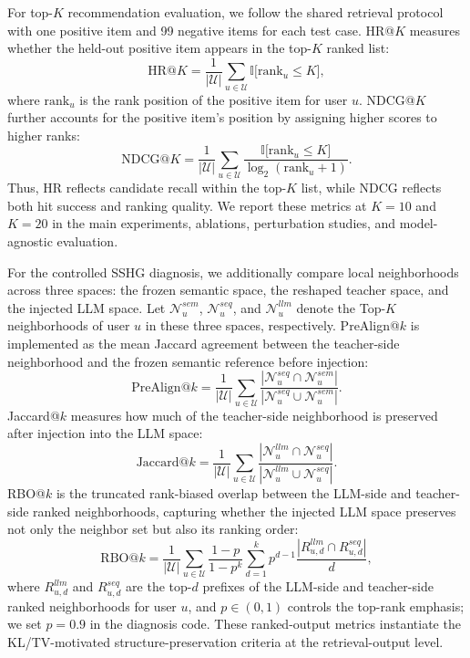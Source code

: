 ﻿\documentclass{article}
\begin{document}
For top-\(K\) recommendation evaluation, we follow the shared retrieval protocol with one positive item and 99 negative items for each test case. HR@$K$ measures whether the held-out positive item appears in the top-\(K\) ranked list:
\begin{equation}
\mathrm{HR@}K
=
\frac{1}{|\mathcal U|}\sum_{u\in\mathcal U}
\mathbb{I}\big[\mathrm{rank}_u \le K\big],
\end{equation}
where $\mathrm{rank}_u$ is the rank position of the positive item for user $u$. NDCG@$K$ further accounts for the positive item's position by assigning higher scores to higher ranks:
\begin{equation}
\mathrm{NDCG@}K
=
\frac{1}{|\mathcal U|}\sum_{u\in\mathcal U}
\frac{\mathbb{I}\big[\mathrm{rank}_u \le K\big]}
{\log_2(\mathrm{rank}_u+1)}.
\end{equation}
Thus, HR reflects candidate recall within the top-$K$ list, while NDCG reflects both hit success and ranking quality. We report these metrics at $K=10$ and $K=20$ in the main experiments, ablations, perturbation studies, and model-agnostic evaluation.

For the controlled SSHG diagnosis, we additionally compare local neighborhoods across three spaces: the frozen semantic space, the reshaped teacher space, and the injected LLM space. Let $\mathcal N_u^{sem}$, $\mathcal N_u^{seq}$, and $\mathcal N_u^{llm}$ denote the Top-$K$ neighborhoods of user $u$ in these three spaces, respectively. PreAlign@$k$ is implemented as the mean Jaccard agreement between the teacher-side neighborhood and the frozen semantic reference before injection:
\begin{equation}
\mathrm{PreAlign@}k
=
\frac{1}{|\mathcal U|}\sum_{u\in\mathcal U}
\frac{|\mathcal N_u^{seq}\cap\mathcal N_u^{sem}|}
{|\mathcal N_u^{seq}\cup\mathcal N_u^{sem}|}.
\end{equation}
Jaccard@$k$ measures how much of the teacher-side neighborhood is preserved after injection into the LLM space:
\begin{equation}
\mathrm{Jaccard@}k
=
\frac{1}{|\mathcal U|}\sum_{u\in\mathcal U}
\frac{|\mathcal N_u^{llm}\cap\mathcal N_u^{seq}|}
{|\mathcal N_u^{llm}\cup\mathcal N_u^{seq}|}.
\end{equation}
RBO@$k$ is the truncated rank-biased overlap between the LLM-side and teacher-side ranked neighborhoods, capturing whether the injected LLM space preserves not only the neighbor set but also its ranking order:
\begin{equation}
\mathrm{RBO@}k
=
\frac{1}{|\mathcal U|}\sum_{u\in\mathcal U}
\frac{1-p}{1-p^k}
\sum_{d=1}^{k}
p^{d-1}
\frac{|R_{u,d}^{llm}\cap R_{u,d}^{seq}|}{d},
\end{equation}
where $R_{u,d}^{llm}$ and $R_{u,d}^{seq}$ are the top-$d$ prefixes of the LLM-side and teacher-side ranked neighborhoods for user $u$, and $p\in(0,1)$ controls the top-rank emphasis; we set $p=0.9$ in the diagnosis code. These ranked-output metrics instantiate the KL/TV-motivated structure-preservation criteria at the retrieval-output level.
\end{document}
